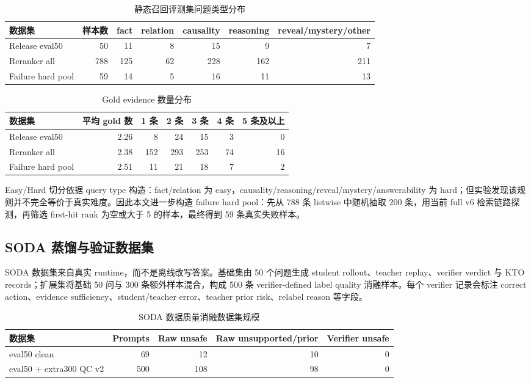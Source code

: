 \documentclass[UTF8,a4paper,12pt]{ctexart}
\begin{document}
\begin{table}[htbp]
\centering
\small
\begin{tabular}{lrrrrrr}
\toprule
数据集 & 样本数 & fact & relation & causality & reasoning & reveal/mystery/other \\
\midrule
Release eval50 & 50 & 11 & 8 & 15 & 9 & 7 \\
Reranker all & 788 & 125 & 62 & 228 & 162 & 211 \\
Failure hard pool & 59 & 14 & 5 & 16 & 11 & 13 \\
\bottomrule
\end{tabular}
\caption{静态召回评测集问题类型分布}
\end{table}

\begin{table}[htbp]
\centering
\small
\begin{tabular}{lrrrrrr}
\toprule
数据集 & 平均 gold 数 & 1 条 & 2 条 & 3 条 & 4 条 & 5 条及以上 \\
\midrule
Release eval50 & 2.26 & 8 & 24 & 15 & 3 & 0 \\
Reranker all & 2.38 & 152 & 293 & 253 & 74 & 16 \\
Failure hard pool & 2.51 & 11 & 21 & 18 & 7 & 2 \\
\bottomrule
\end{tabular}
\caption{Gold evidence 数量分布}
\end{table}

Easy/Hard 切分依据 query type 构造：fact/relation 为 easy，causality/reasoning/reveal/mystery/answerability 为 hard；但实验发现该规则并不完全等价于真实难度。因此本文进一步构造 failure hard pool：先从 788 条 listwise 中随机抽取 200 条，用当前 full v6 检索链路探测，再筛选 first-hit rank 为空或大于 5 的样本，最终得到 59 条真实失败样本。

\subsection{SODA 蒸馏与验证数据集}

SODA 数据集来自真实 runtime，而不是离线改写答案。基础集由 50 个问题生成 student rollout、teacher replay、verifier verdict 与 KTO records；扩展集将基础 50 问与 300 条额外样本混合，构成 500 条 verifier-defined label quality 消融样本。每个 verifier 记录会标注 correct action、evidence sufficiency、student/teacher error、teacher prior risk、relabel reason 等字段。

\begin{table}[htbp]
\centering
\small
\begin{tabular}{lrrrr}
\toprule
数据集 & Prompts & Raw unsafe & Raw unsupported/prior & Verifier unsafe \\
\midrule
eval50 clean & 69 & 12 & 10 & 0 \\
eval50 + extra300 QC v2 & 500 & 108 & 98 & 0 \\
\bottomrule
\end{tabular}
\caption{SODA 数据质量消融数据集规模}
\end{table}
\end{document}
